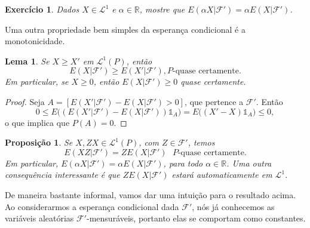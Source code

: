 \documentclass[reqno, draft]{book}
\newcommand*\1{\mathds{1}}
\newtheorem{lemma}[theorem]{Lema}
\newtheorem{proposition}[theorem]{Proposição}
\newtheorem{exercise}[example]{Exercício}
\begin{document}
\begin{exercise}
  Dados $X \in \mathcal{L}^1$ e $\alpha \in \mathbb{R}$, mostre que $E(\alpha X|\mathcal{F}') = \alpha E(X|\mathcal{F}')$.
\end{exercise}

Uma outra propriedade bem simples da esperança condicional é a monotonicidade.

\begin{lemma}
  \label{l:ec_mono}
  Se $X \geq X'$ em $\mathcal{L}^1(P)$, então
  \begin{equation}
    E(X|\mathcal{F}') \geq E(X'|\mathcal{F}'), \text{$P$-quase certamente.}
  \end{equation}
  Em particular, se $X \geq 0$, então $E(X|\mathcal{F}') \geq 0$ quase certamente.
\end{lemma}

\begin{proof}
  Seja $A = [E(X'|\mathcal{F}') - E(X|\mathcal{F}') > 0]$, que pertence a $\mathcal{F}'$.
  Então
  \begin{equation}
    0 \leq E\big( (E(X'|\mathcal{F}') - E(X|\mathcal{F}')) \1_A \big) = E\big((X' - X) \1_A\big) \leq 0,
  \end{equation}
  o que implica que $P(A) = 0$.
\end{proof}



\begin{proposition}
  \label{p:EZX_ZEX}
  Se $X, ZX \in \mathcal{L}^1(P)$, com $Z \in \mathcal{F}'$, temos
  \begin{equation}
    E(XZ|\mathcal{F}') = Z E(X|\mathcal{F}') \text{ $P$-quase certamente}.
  \end{equation}
  Em particular, $E(\alpha X|\mathcal{F}') = \alpha E(X|\mathcal{F}')$, para todo $\alpha \in \mathbb{R}$.
  Uma outra consequência interessante é que $Z E(X|\mathcal{F}')$ estará automaticamente em $\mathcal{L}^1$.
\end{proposition}

De maneira bastante informal, vamos dar uma intuição para o resultado acima.
Ao considerarmos a esperança condicional dada $\mathcal{F}'$, nós já conhecemos as variáveis aleatórias $\mathcal{F}'$-mensuráveis, portanto elas se comportam como constantes.
\end{document}
